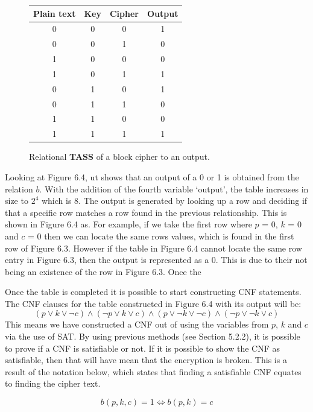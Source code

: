 \documentclass[11pt,a4paper, notitlepage]{report}
\begin{document}
\begin{figure}[H]
\centering
\label{tab:stage3}
\begin{tabular}{|c|c|c|c|}
\hline
Plain text & Key & Cipher & Output\\ \hline
0 & 0 & 0 & 1\\ \hline
0 & 0 & 1 & 0\\ \hline
1 & 0 & 0 & 0\\ \hline
1 & 0 & 1 & 1\\ \hline
0 & 1 & 0 & 1\\ \hline
0 & 1 & 1 & 0\\ \hline
1 & 1 & 0 & 0\\ \hline
1 & 1 & 1 & 1\\ \hline
\end{tabular}
\caption{Relational \textbf{TASS} of a block cipher to an output.}
\end{figure}
Looking at Figure 6.4, ut shows that an output of a 0 or 1 is obtained from the relation $b$. With the addition of the fourth variable `output', the table increases in size to $2^{4}$ which is 8. The output is generated by looking up a row and deciding if that a specific row matches a row found in the previous relationship. This is shown in Figure 6.4 as. For example, if we take the first row where $p$ = 0, $k$ = 0 and $c$ = 0 then we can locate the same rows values, which is found in the first row of Figure 6.3. However if the table in Figure 6.4 cannot locate the same row entry in Figure 6.3, then the output is represented as a 0. This is due to their not being an existence of the row in Figure 6.3. Once the 

Once the table is completed it is possible to start constructing CNF statements. 
The CNF clauses for the table constructed in Figure 6.4 with its output will be:
\begin{displaymath}
(p \lor k \lor \neg c) \land (\neg p \lor k \lor c) \land (p \lor \neg k \lor \neg c) \land (\neg p \lor \neg k \lor c)
\end{displaymath}
This means we have constructed a CNF out of using the variables from $p$, $k$ and $c$ via the use of SAT. By using previous methods (see Section 5.2.2), it is possible to prove if a CNF is satisfiable or not. If it is possible to show the CNF as satisfiable, then that will have mean that the encryption is broken. This is a result of the notation below, which states that finding a satisfiable CNF equates to finding the cipher text. 

\begin{displaymath}
b(p,k,c) = 1 \Leftrightarrow b(p,k) = c
\end{displaymath}
\end{document}
